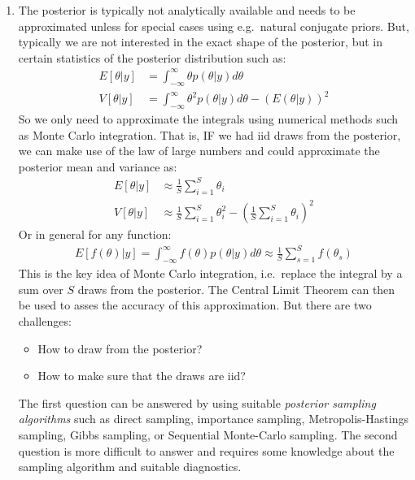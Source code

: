 \begin{enumerate}
\item The posterior is typically not analytically available and needs to be approximated
  unless for special cases using e.g.\ natural conjugate priors.
But, typically we are not interested in the exact shape of the posterior,
  but in certain statistics of the posterior distribution such as:
\begin{align*}
E[\theta|y] &= \int_{-\infty}^{\infty} \theta p(\theta|y) d\theta
\\
V[\theta|y] &= \int_{-\infty}^{\infty} \theta^2 p(\theta|y) d\theta - (E(\theta|y))^2
\end{align*}
So we only need to approximate the integrals using numerical methods such as Monte Carlo integration.
That is, IF we had iid draws from the posterior, we can make use of the law of large numbers
  and could approximate the posterior mean and variance as:
\begin{align*}
E[\theta|y] &\approx \frac{1}{S} \sum_{i=1}^S \theta_i
\\
V[\theta|y] &\approx \frac{1}{S} \sum_{i=1}^S \theta_i^2 - {\left(\frac{1}{S} \sum_{i=1}^S \theta_i\right)}^2
\end{align*}
Or in general for any function:
\begin{align*}
E[f(\theta)|y] = \int_{-\infty}^{\infty} f(\theta) p(\theta|y) d\theta \approx \frac{1}{S} \sum_{s=1}^S f(\theta_s)
\end{align*}
This is the key idea of Monte Carlo integration,
  i.e.\ replace the integral by a sum over \(S\) draws from the posterior.
The Central Limit Theorem can then be used to asses the accuracy of this approximation.
But there are two challenges:
\begin{itemize}
\item How to draw from the posterior?
\item How to make sure that the draws are iid?
\end{itemize}
The first question can be answered by using suitable \emph{posterior sampling algorithms}
  such as direct sampling, importance sampling, Metropolis-Hastings sampling, Gibbs sampling, or  Sequential Monte-Carlo sampling.
The second question is more difficult to answer and requires some knowledge about the sampling algorithm and suitable diagnostics.
\end{enumerate}